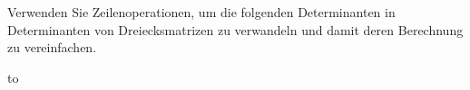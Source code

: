 Verwenden Sie Zeilenoperationen, um die folgenden Determinanten in
Determinanten von Dreiecksmatrizen zu verwandeln und damit deren Berechnung
zu vereinfachen.

\vspace*{5pt}
\hbox to

